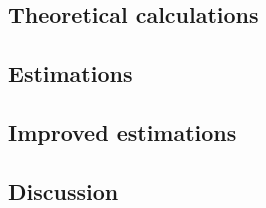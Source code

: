 \subsection{Theoretical calculations}

\subsection{Estimations}

\subsection{Improved estimations}

\subsection{Discussion}
